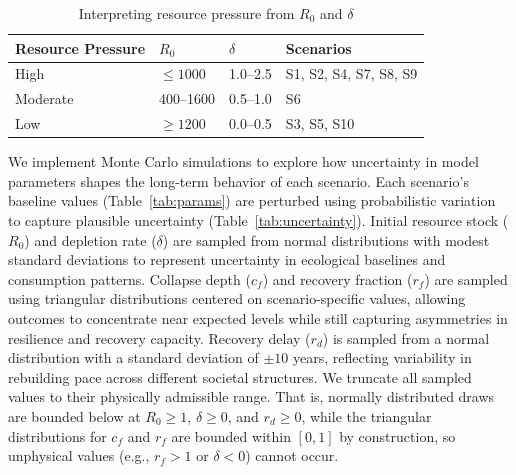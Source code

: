 \begin{table}[htbp]
\centering
\caption{Interpreting resource pressure from $R_0$ and $\delta$}
\label{tab:resources}
\begin{tabular}{llll}
\toprule
Resource Pressure & $R_0$ & $\delta$ & Scenarios \\
\midrule
High & $\leq 1000$ & 1.0--2.5 & S1, S2, S4, S7, S8, S9 \\
Moderate & 400--1600 & 0.5--1.0 & S6 \\
Low & $\geq 1200$ & 0.0--0.5 & S3, S5, S10 \\
\bottomrule
\end{tabular}
\end{table}

We implement Monte Carlo simulations to explore how uncertainty in model parameters shapes the long-term behavior of each scenario. Each scenario's baseline values (Table~\ref{tab:params}) are perturbed using probabilistic variation to capture plausible uncertainty (Table~\ref{tab:uncertainty}). Initial resource stock (\(R_{0}\)) and depletion rate (\(\delta\)) are sampled from normal distributions with modest standard deviations to represent uncertainty in ecological baselines and consumption patterns. Collapse depth (\(c_{f}\)) and recovery fraction (\(r_{f}\)) are sampled using triangular distributions centered on scenario-specific values, allowing outcomes to concentrate near expected levels while still capturing asymmetries in resilience and recovery capacity. Recovery delay (\(r_{d}\)) is sampled from a normal distribution with a standard deviation of $\pm 10$ years, reflecting variability in rebuilding pace across different societal structures. We truncate all sampled values to their physically admissible range. That is, normally distributed draws are bounded below at $R_0 \geq 1$, $\delta \geq 0$, and $r_d \geq 0$, while the triangular distributions for $c_f$ and $r_f$ are bounded within $[0, 1]$ by construction, so unphysical values (e.g., $r_f > 1$ or $\delta < 0$) cannot occur.

